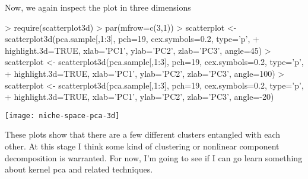 \documentclass[10pt]{article}
\renewenvironment{Schunk}{\vspace{\topsep}}{\vspace{\topsep}}
\begin{document}
Now, we again inspect the plot in three dimensions

\begin{Schunk}
\begin{Sinput}
> require(scatterplot3d)
> par(mfrow=c(3,1))
> scatterplot <- scatterplot3d(pca.sample[,1:3], pch=19, cex.symbols=0.2, type='p',
+                              highlight.3d=TRUE, xlab='PC1', ylab='PC2', zlab='PC3', angle=45)
> scatterplot <- scatterplot3d(pca.sample[,1:3], pch=19, cex.symbols=0.2, type='p',
+                              highlight.3d=TRUE, xlab='PC1', ylab='PC2', zlab='PC3', angle=100)
> scatterplot <- scatterplot3d(pca.sample[,1:3], pch=19, cex.symbols=0.2, type='p',
+                              highlight.3d=TRUE, xlab='PC1', ylab='PC2', zlab='PC3', angle=-20)
\end{Sinput}
\end{Schunk}
\texttt{[image: niche-space-pca-3d]}

These plots show that there are a few different clusters entangled with each other. At this stage I think some kind of clustering or nonlinear component decomposition is warranted. For now, I'm going to see if I can go learn something about kernel pca and related techniques.
\end{document}
